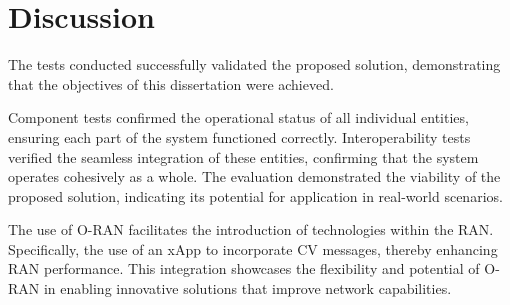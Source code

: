 \section{Discussion}\label{sec:discuss}
The tests conducted successfully validated the proposed solution, demonstrating that the objectives of this dissertation were achieved.

Component tests confirmed the operational status of all individual entities, ensuring each part of the system functioned correctly.
Interoperability tests verified the seamless integration of these entities, confirming that the system operates cohesively as a whole.
The evaluation demonstrated the viability of the proposed solution, indicating its potential for application in real-world scenarios.

The use of O-RAN facilitates the introduction of technologies within the RAN\@.
Specifically, the use of an xApp to incorporate CV messages, thereby enhancing RAN performance.
This integration showcases the flexibility and potential of O-RAN in enabling innovative solutions that improve network capabilities.
